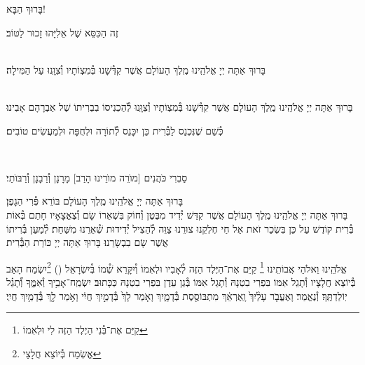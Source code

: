 \documentclass[twoside, openany, parskip=half, 11pt]{book}
\begin{document}
\begin{Large}
בָּרוּךְ הַבָּא!

\end{Large}

זֶה הַכִּסֵּא שֶׁל אֵלִיָּהוּ זָכוּר לַטּוֹב׃


\\
בָּרוּךְ אַתָּה יְיָ אֱלֹהֵֽינוּ מֶֽלֶךְ הָעוֹלָם אֲשֶׁר קִדְּ֯שָׁנוּ בְּ֯מִצְוֹתָיו וְ֯צִוָּֽנוּ עַל הַמִּילָה׃

\\
בָּרוּךְ אַתָּה יְיָ אֱלֹהֵֽינוּ מֶֽלֶךְ הָעוֹלָם אֲשֶׁר קִדְּ֯שָׁנוּ בְּ֯מִצְוֹתָיו וְ֯צִוָּֽנוּ לְ֯הַכְנִיסוֹ בִבְרִיתוֹ שֶׁל אַבְרָהָם אָבִינוּ׃

\kahal
כְּ֯שֵׁם שֶׁנִּכְנַס לַבְּ֯רִית כֵּן יִכָּנֵס לְ֯תוֹרָה וּלְחֻפָּה וּלְמַעֲשִׂים טוֹבִים׃

\\
\begin{footnotesize}
סַבְרִי כֹּהֲנִים [מוׂרֵה מוׂרֵינוּ הָרַב] מָרָנָן וְ֯רַבָנָן וְ֯רַבּוׂתַי׃\\
\end{footnotesize}
בָּרוּךְ אַתָּה יְיָ אֱלֹהֵֽינוּ מֶֽלֶךְ הָעוֹלָם בּוֹרֵא פְּ֯רִי הַגָפֶן׃\\
בָּרוּךְ אַתָּה יְיָ אֱלֹהֵֽינוּ מֶֽלֶךְ הָעוֹלָם אֲשֶׁר קִדַּשׁ יְ֯דִיד מִבֶּטֶן וְ֯חוֹק בִּשְׁאֵרוֹ שָׂם וְ֯צֶאֱצָאָיו חָתַם בְּ֯אוֹת בְּ֯רִית קוֹדֶשׁ עַל כֵּן בִּשְׂכַר זֹאת אֵל חַי חֶלְקֵנוּ צוּרֵנוּ צַוֵּה לְ֯הַצִיל יְ֯דִידוּת שְׁ֯אֵרֵנוּ מִשַּׁחַת׃ לְ֯מַעַן בְּ֯רִיתוֹ אֲשֶׁר שָׂם בִבְשָׂרֵנוּ׃ בָּרוּךְ אַתָּה יְיָ כּוֹרֵת הַבְּ֯רִית׃

אֱלֹהֵֽינוּ וֵאלֹהֵי אֲבוֹתֵינוּ \footnote{
קַיֵּם אֶת־בְּ֯נִי הַיֶלֶד הַזֶּה לִי וּלְאִמוֹ} קַיֵּם אֶת־הַיֶּלֶד הַזֶּה לְ֯אָבִיו וּלְאִמוֹ וְ֯יִקָּרֵא שְׁ֯מוֹ בְּ֯יִשְׂרָאֵל () \footnote{
אֱשְׂמַח בְּ֯יוֹצֵא חֲלָצַי}יִשְׂמַח הָאַב בְּ֯יוֹצֵא חֲלָצָיו וְ֯תָגֵל אִמּוֹ בִּפְרִי בִטְנָהּ וְ֯תָגֵל אִמּוֹ בְּ֯גַן עֵדֶן בִּפְרִי בִטְנָהּ
כַּכָּתוּב׃ יִשְׂמַֽח־אָבִ֥יךָ וְ֯אִמֶּ֑ךָ וְ֝֯תָגֵ֗ל יֽוֹלַדְתֶּֽךָ׃
וְ֯נֶאֱמַר׃ וָאֶעֱבֹ֤ר עָלַ֨יִךְ֙ וָֽאֶרְאֵ֔ךְ מִתְבּוֹסֶ֖סֶת בְּ֯דָמָ֑יִךְ
וָאֹ֤מַר לָךְ֙ בְּ֯דָמַ֣יִךְ חֲיִ֔י וָאֹ֥מַר לָ֖ךְ בְּ֯דָמַ֥יִךְ חֲיִֽי׃
\end{document}
